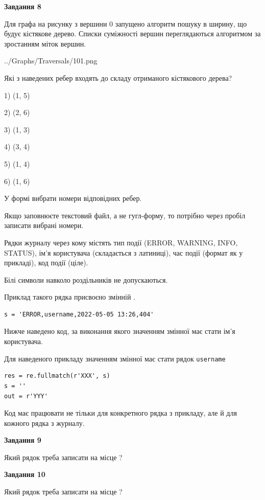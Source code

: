 \documentclass[12pt, ukrainian]{article}
\def\code#1{\Verb!#1!}
\begin{document}
{\begin {large}
{\begin {center}\textbf{Завдання 8}\end {center}}\par
Для графа на рисунку з вершини 0 запущено алгоритм пошуку в ширину, що будує кістякове дерево. Списки суміжності вершин переглядаються алгоритмом за зростанням міток вершин.\par
\begin{center}
	{../Graphs/Traversals/101.png}
\end{center}
\par Які з наведених ребер входять до складу отриманого кістякового дерева?\par
1) (1, 5)\par
2) (2, 6)\par
3) (1, 3)\par
4) (3, 4)\par
5) (1, 4)\par
6) (1, 6)\par
{\vskip 15pt} У формі вибрати номери відповідних ребер.


Якщо заповнюєте текстовий файл, а не гугл-форму, то потрібно через пробіл записа\-ти вибрані номери.\par
\newpage


Рядки журналу через кому містять тип події (ERROR, WARNING, INFO, STATUS), ім'я користувача (складається з латиниці), час події (фор\-мат як у прикладі), код події (ціле).

Білі символи навколо роздільників не допускаються.

Приклад такого рядка присвоєно змінній .



\begin{verbatim}
s = 'ERROR,username,2022-05-05 13:26,404'
\end{verbatim}


Нижче наведено код, за виконання якого значенням змінної  має стати ім'я користувача.

Для наведеного прикладу значенням змінної  має стати рядок \code{username}



\begin{verbatim}
res = re.fullmatch(r'XXX', s)
s = ''
out = r'YYY'
\end{verbatim}


Код має працювати не тільки для конкретного рядка з прикладу, але й для кожного рядка з журналу.

{\begin {center}\textbf{Завдання 9}\end {center}}\par
Який рядок треба записати на місце  ?\par
\vspace{5mm}


{\begin {center}\textbf{Завдання 10}\end {center}}\par
Який рядок треба записати на місце  ?\par


\newpage


\end {large}}
\end{document}
